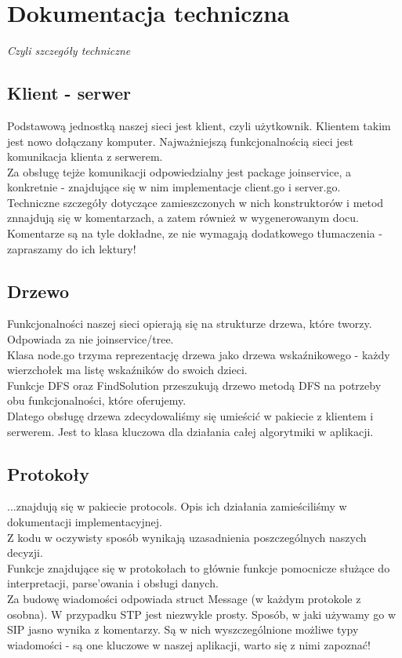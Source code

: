 \section{Dokumentacja techniczna}

\begin{center}
\textit{Czyli szczegóły techniczne}
\end{center}

\subsection{Klient - serwer}
Podstawową jednostką naszej sieci jest klient, czyli użytkownik. Klientem takim jest nowo dołączany komputer. Najważniejszą funkcjonalnością sieci jest komunikacja klienta z serwerem.\\
\indent Za obsługę tejże komunikacji odpowiedzialny jest package joinservice, a konkretnie - znajdujące się w nim implementacje client.go i server.go.\\
\indent Techniczne szczegóły dotyczące zamieszczonych w nich konstruktorów i metod znnajdują się w komentarzach, a zatem również w wygenerowanym docu. Komentarze są na tyle dokładne, ze nie wymagają dodatkowego tłumaczenia - zapraszamy do ich lektury!

\subsection{Drzewo}
Funkcjonalności naszej sieci opierają się na strukturze drzewa, które tworzy. Odpowiada za nie joinservice/tree.\\
\indent Klasa node.go trzyma reprezentację drzewa jako drzewa wskaźnikowego - każdy wierzchołek ma listę wskaźników do swoich dzieci.\\
\indent Funkcje DFS oraz FindSolution przeszukują drzewo metodą DFS na potrzeby obu funkcjonalności, które oferujemy.\\
\indent Dlatego obsługę drzewa zdecydowaliśmy się umieścić w pakiecie z klientem i serwerem. Jest to klasa kluczowa dla działania całej algorytmiki w aplikacji.

\subsection{Protokoły}
...znajdują się w pakiecie protocols. Opis ich działania zamieściliśmy w dokumentacji implementacyjnej.\\
\indent Z kodu w oczywisty sposób wynikają uzasadnienia poszczególnych naszych decyzji.\\
\indent Funkcje znajdujące się w protokołach to głównie funkcje pomocnicze służące do interpretacji, parse'owania i obsługi danych.\\
\indent Za budowę wiadomości odpowiada struct Message (w każdym protokole z osobna). W przypadku STP jest niezwykle prosty. Sposób, w jaki używamy go w SIP jasno wynika z komentarzy. Są w nich wyszczególnione możliwe typy wiadomości - są one kluczowe w naszej aplikacji, warto się z nimi zapoznać!

